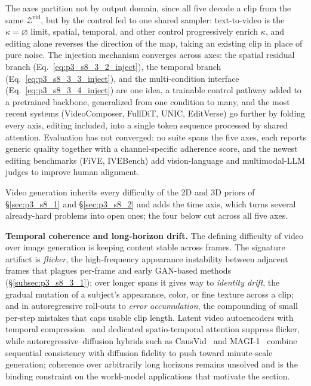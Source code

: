 The axes partition not by output domain, since all five decode a clip from the same $\mathcal{Z}^{\text{vid}}$, but by the control fed to one shared sampler: text-to-video is the $\kappa=\varnothing$ limit, spatial, temporal, and other control progressively enrich $\kappa$, and editing alone reverses the direction of the map, taking an existing clip in place of pure noise.
The injection mechanism converges across axes: the spatial residual branch (Eq.~\eqref{eq:p3_s8_3_2_inject}), the temporal branch (Eq.~\eqref{eq:p3_s8_3_3_inject}), and the multi-condition interface (Eq.~\eqref{eq:p3_s8_3_4_inject}) are one idea, a trainable control pathway added to a pretrained backbone, generalized from one condition to many, and the most recent systems (VideoComposer, FullDiT, UNIC, EditVerse) go further by folding every axis, editing included, into a single token sequence processed by shared attention.
Evaluation has not converged: no suite spans the five axes, each reports generic quality together with a channel-specific adherence score, and the newest editing benchmarks (FiVE, IVEBench) add vision-language and multimodal-LLM judges to improve human alignment.

Video generation inherits every difficulty of the 2D and 3D priors of §\ref{sec:p3_s8_1} and §\ref{sec:p3_s8_2} and adds the time axis, which turns several already-hard problems into open ones; the four below cut across all five axes.

\noindent\textbf{Temporal coherence and long-horizon drift.} The defining difficulty of video over image generation is keeping content stable across frames. The signature artifact is \emph{flicker}, the high-frequency appearance instability between adjacent frames that plagues per-frame and early GAN-based methods (§\ref{subsec:p3_s8_3_1}); over longer spans it gives way to \emph{identity drift}, the gradual mutation of a subject's appearance, color, or fine texture across a clip; and in autoregressive roll-outs to \emph{error accumulation}, the compounding of small per-step mistakes that caps usable clip length. Latent video autoencoders with temporal compression~\cite{blattmann2023stable,blattmann2023align} and dedicated spatio-temporal attention suppress flicker, while autoregressive--diffusion hybrids such as CausVid~\cite{yin2025slow} and MAGI-1~\cite{ai2025magi1autoregressivevideogeneration} combine sequential consistency with diffusion fidelity to push toward minute-scale generation; coherence over arbitrarily long horizons remains unsolved and is the binding constraint on the world-model applications that motivate the section.

